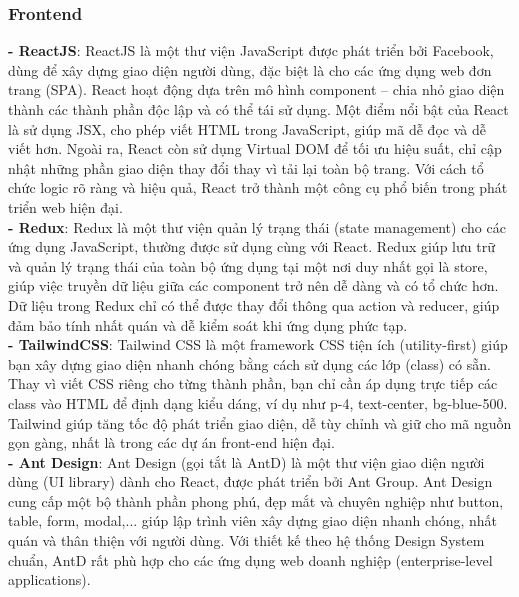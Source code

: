 \documentclass[a4paper,12pt]{article}
\begin{document}
\subsubsection{Frontend}
\textbf{- ReactJS}: ReactJS là một thư viện JavaScript được phát triển bởi Facebook, dùng để xây dựng giao diện người dùng, đặc biệt là cho các ứng dụng web đơn trang (SPA). React hoạt động dựa trên mô hình component – chia nhỏ giao diện thành các thành phần độc lập và có thể tái sử dụng. Một điểm nổi bật của React là sử dụng JSX, cho phép viết HTML trong JavaScript, giúp mã dễ đọc và dễ viết hơn. Ngoài ra, React còn sử dụng Virtual DOM để tối ưu hiệu suất, chỉ cập nhật những phần giao diện thay đổi thay vì tải lại toàn bộ trang. Với cách tổ chức logic rõ ràng và hiệu quả, React trở thành một công cụ phổ biến trong phát triển web hiện đại. \\  
\textbf{- Redux}: Redux là một thư viện quản lý trạng thái (state management) cho các ứng dụng JavaScript, thường được sử dụng cùng với React. Redux giúp lưu trữ và quản lý trạng thái của toàn bộ ứng dụng tại một nơi duy nhất gọi là store, giúp việc truyền dữ liệu giữa các component trở nên dễ dàng và có tổ chức hơn. Dữ liệu trong Redux chỉ có thể được thay đổi thông qua action và reducer, giúp đảm bảo tính nhất quán và dễ kiểm soát khi ứng dụng phức tạp.\\ 
\textbf{- TailwindCSS}: Tailwind CSS là một framework CSS tiện ích (utility-first) giúp bạn xây dựng giao diện nhanh chóng bằng cách sử dụng các lớp (class) có sẵn. Thay vì viết CSS riêng cho từng thành phần, bạn chỉ cần áp dụng trực tiếp các class vào HTML để định dạng kiểu dáng, ví dụ như p-4, text-center, bg-blue-500. Tailwind giúp tăng tốc độ phát triển giao diện, dễ tùy chỉnh và giữ cho mã nguồn gọn gàng, nhất là trong các dự án front-end hiện đại. \\  
\textbf{- Ant Design}: Ant Design (gọi tắt là AntD) là một thư viện giao diện người dùng (UI library) dành cho React, được phát triển bởi Ant Group. Ant Design cung cấp một bộ thành phần phong phú, đẹp mắt và chuyên nghiệp như button, table, form, modal,... giúp lập trình viên xây dựng giao diện nhanh chóng, nhất quán và thân thiện với người dùng. Với thiết kế theo hệ thống Design System chuẩn, AntD rất phù hợp cho các ứng dụng web doanh nghiệp (enterprise-level applications).  
\end{document}
